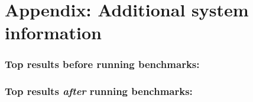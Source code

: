 \documentclass{article}
\begin{document}
\pagebreak
\appendix
\section{Appendix: Additional system information}

\subsubsection*{Top results before running benchmarks:}
{
\footnotesize

}
\subsubsection*{Top results {\em after} running benchmarks:}
{
\footnotesize

}
\end{document}
